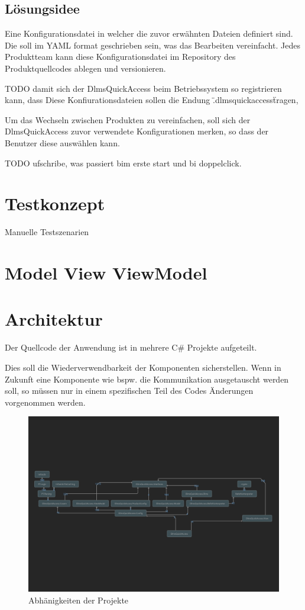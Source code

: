 \subsection{Lösungsidee}
Eine Konfigurationsdatei in welcher die zuvor erwähnten Dateien definiert sind. Die soll im YAML format geschrieben sein, was das Bearbeiten vereinfacht.
Jedes Produktteam kann diese Konfigurationsdatei im Repository des Produktquellcodes ablegen und versionieren.

TODO
damit sich der DlmsQuickAccess beim Betriebssystem so registrieren kann, dass 
Diese Konfiurationsdateien sollen die Endung \".dlmsquickaccess\" tragen, 

Um das Wechseln zwischen Produkten zu vereinfachen, soll sich der DlmsQuickAccess zuvor verwendete Konfigurationen merken, so dass der Benutzer diese auswählen kann.


TODO ufschribe, was passiert bim erste start und bi doppelclick.



\section{Testkonzept}

Manuelle Testszenarien

\section{Model View ViewModel}\label{mvvm}

\section{Architektur}
Der Quellcode der Anwendung ist in mehrere C\# Projekte aufgeteilt.

Dies soll die Wiederverwendbarkeit der Komponenten sicherstellen.
Wenn in Zukunft eine Komponente wie bspw. die Kommunikation ausgetauscht werden soll, so müssen nur in einem spezifischen Teil des Codes Änderungen vorgenommen werden.

\begin{figure}[H]
   \centering
   \includegraphics[width=1.0\textwidth]{gfx/Architecture view for DlmsQuickAccess.png}
   \caption{
      Abhänigkeiten der Projekte
   }
   \label{fig:projectDependencies}
\end{figure}

